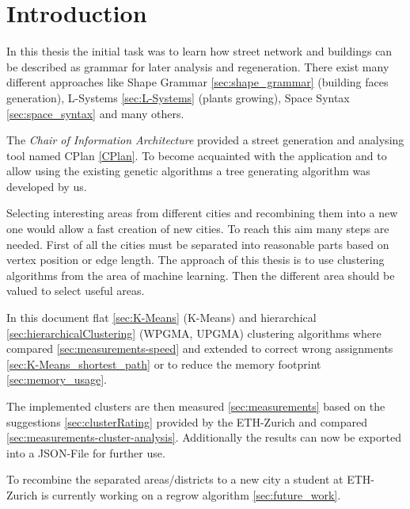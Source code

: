 \chapter{Introduction}
In this thesis the initial task was to learn how street network and buildings can be described as grammar for later analysis and regeneration. There exist many different approaches like Shape Grammar \ref{sec:shape_grammar} (building faces generation), L-Systems \ref{sec:L-Systems} (plants growing), Space Syntax \ref{sec:space_syntax} and many others. 

The \textit{Chair of Information Architecture} provided a street generation and analysing tool named CPlan \ref{CPlan}. To become acquainted with the application and to allow using the existing genetic algorithms a tree generating algorithm was developed by us. 

Selecting interesting areas from different cities and recombining them into a new one would allow a fast creation of new cities. To reach this aim many steps are needed. First of all the cities must be separated into reasonable parts based on vertex position or edge length. The approach of this thesis is to use clustering algorithms from the area of machine learning. Then the different area should be valued to select useful areas.

In this document flat \ref{sec:K-Means} (K-Means) and hierarchical \ref{sec:hierarchicalClustering} (WPGMA, UPGMA) clustering algorithms where compared \ref{sec:measurements-speed} and extended to correct wrong assignments \ref{sec:K-Means_shortest_path} or to reduce the memory footprint \ref{sec:memory_usage}.

The implemented clusters are then measured \ref{sec:measurements} based on the suggestions \ref{sec:clusterRating} provided by the ETH-Zurich and compared \ref{sec:measurements-cluster-analysis}. Additionally the results can now be exported into a JSON-File for further use.

To recombine the separated areas/districts to a new city a student at ETH-Zurich is currently working on a regrow algorithm \ref{sec:future_work}. 